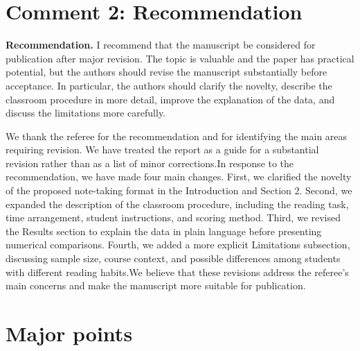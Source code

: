 \section*{Comment 2: Recommendation}
\begin{commentbox}
\textbf{Recommendation.} I recommend that the manuscript be considered for publication after major revision. The topic is valuable and the paper has practical potential, but the authors should revise the manuscript substantially before acceptance. In particular, the authors should clarify the novelty, describe the classroom procedure in more detail, improve the explanation of the data, and discuss the limitations more carefully.
\end{commentbox}
\begin{replybox}
We thank the referee for the recommendation and for identifying the main areas requiring revision. We have treated the report as a guide for a substantial revision rather than as a list of minor corrections.In response to the recommendation, we have made four main changes. First, we clarified the novelty of the proposed note-taking format in the Introduction and Section 2. Second, we expanded the description of the classroom procedure, including the reading task, time arrangement, student instructions, and scoring method. Third, we revised the Results section to explain the data in plain language before presenting numerical comparisons. Fourth, we added a more explicit Limitations subsection, discussing sample size, course context, and possible differences among students with different reading habits.We believe that these revisions address the referee's main concerns and make the manuscript more suitable for publication.
\end{replybox}
\section*{Major points}
